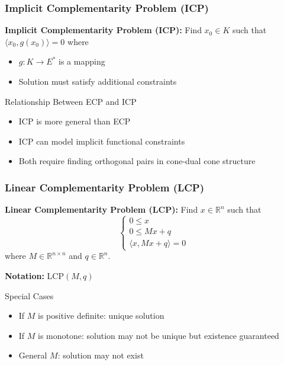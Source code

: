 \documentclass[aspectratio=169,10pt]{beamer}
\begin{document}
\begin{frame}
    \frametitle{Implicit Complementarity Problem (ICP)}

    \begin{definition}
        \textbf{Implicit Complementarity Problem (ICP):} Find $x_0 \in K$ such that $\langle x_0, g(x_0) \rangle = 0$ where
        \begin{itemize}
            \item $g: K \to E^*$ is a mapping
            \item Solution must satisfy additional constraints
        \end{itemize}
    \end{definition}

    \bigskip

    \begin{block}{Relationship Between ECP and ICP}
        \begin{itemize}
            \item ICP is more general than ECP
            \item ICP can model implicit functional constraints
            \item Both require finding orthogonal pairs in cone-dual cone structure
        \end{itemize}
    \end{block}
\end{frame}

\begin{frame}
    \frametitle{Linear Complementarity Problem (LCP)}

    \begin{definition}
        \textbf{Linear Complementarity Problem (LCP):} Find $x \in \mathbb{R}^n$ such that
        \[
        \begin{cases}
            0 \leq x \\
            0 \leq Mx + q \\
            \langle x, Mx + q \rangle = 0
        \end{cases}
        \]
        where $M \in \mathbb{R}^{n \times n}$ and $q \in \mathbb{R}^n$.
    \end{definition}

    \bigskip

    \textbf{Notation:} $\text{LCP}(M, q)$

    \bigskip

    \begin{alertblock}{Special Cases}
        \begin{itemize}
            \item If $M$ is positive definite: unique solution
            \item If $M$ is monotone: solution may not be unique but existence guaranteed
            \item General $M$: solution may not exist
        \end{itemize}
    \end{alertblock}
\end{frame}
\end{document}
